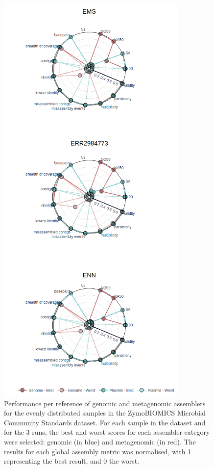 \begin{figure}[]
\centering
\includegraphics[scale=0.95]{figures/chapter 5/Supplemental Figure 3.png}
\caption{Performance per reference of genomic and metagenomic assemblers for the evenly distributed samples in the ZymoBIOMICS Microbial Community Standards dataset. For each sample in the dataset and for the 3 runs, the best and worst scores for each assembler category were selected: genomic (in blue) and metagenomic (in red). The results for each global assembly metric was normalised, with 1 representing the best result, and 0 the worst.}
\label{fig:chap5_sup_figure_3}
\end{figure}

